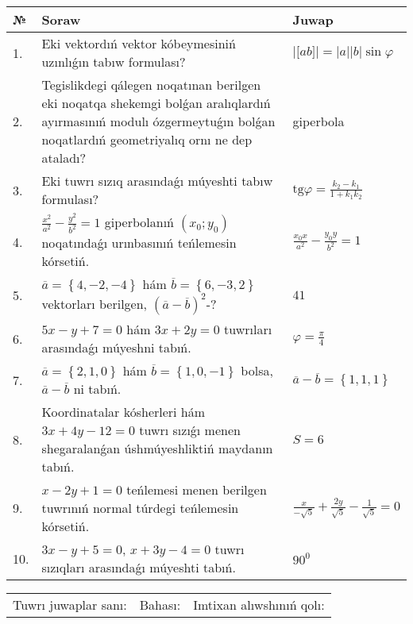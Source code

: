 \documentclass{article}
\begin{document}
\begin{tabular}{|m{0.7cm}|m{10cm}|m{4cm}|}
\hline
№ & Soraw & Juwap \\
\hline
1. & Eki vektordıń vektor kóbeymesiniń uzınlıǵın tabıw formulası? & $\left| \lbrack ab\rbrack \right|=|a||b|\sin\varphi$ \\
\hline
2. & Tegislikdegi qálegen noqatınan berilgen eki noqatqa shekemgi bolǵan aralıqlardıń ayırmasınıń modulı ózgermeytuǵın bolǵan noqatlardıń geometriyalıq ornı ne dep ataladı? & giperbola \\
\hline
3. & Eki tuwrı sızıq arasındaǵı múyeshti tabıw formulası? & $\text{tg}\varphi=\frac{k_2-k_1}{1+k_1k_2}$ \\
\hline
4. & $\frac{x^2}{a^2}-\frac{y^2}{b^2}=1$ giperbolanıń $(x_0;y_0)$ noqatındaǵı urınbasınıń teńlemesin kórsetiń. & $\frac{x_0x}{a^2}-\frac{y_0y}{b^2}=1$ \\
\hline
5. & $\overline{a}=\left\{ 4,-2,-4 \right\}$ hám $\overline{b}=\left\{ 6,-3, 2 \right\}$ vektorları berilgen, $(\overline{a}-\overline{b}) ^{2}$-? & $41$ \\
\hline
6. & $5x-y+7=0$ hám $3x+2y=0$ tuwrıları arasındaǵı múyeshni tabıń. & $\varphi=\frac{\pi}{4}$ \\
\hline
7. & $\overline{a}=\left\{ 2, 1, 0 \right\}$ hám $\overline{b}=\left\{ 1, 0,-1 \right\}$ bolsa, $\overline{a}-\overline{b}$ ni tabıń. & $\overline{a} -\overline{b} = \left\{ 1,1,1 \right\}$ \\
\hline
8. & Koordinatalar kósherleri hám $ 3x+4y-12=0 $ tuwrı sızıǵı menen shegaralanǵan úshmúyeshliktiń maydanın tabıń. & $ S=6 $ \\
\hline
9. & $x-2y+1=0$ teńlemesi menen berilgen tuwrınıń normal túrdegi teńlemesin kórsetiń. & $\frac{x}{- \sqrt{5}}+\frac{2y}{\sqrt{5}}-\frac{1}{\sqrt{5}}=0$ \\
\hline
10. & $3x-y+5=0$, $x+3y-4=0$ tuwrı sızıqları arasındaǵı múyeshti tabıń. & $90^{0}$ \\
\hline
\end{tabular}

\vspace{1cm}

\begin{tabular}{lll}
Tuwrı juwaplar sanı: \underline{\hspace{1.5cm}} & 
Bahası: \underline{\hspace{1.5cm}} & 
Imtixan alıwshınıń qolı: \underline{\hspace{2cm}} \\
\end{tabular}
\end{document}
